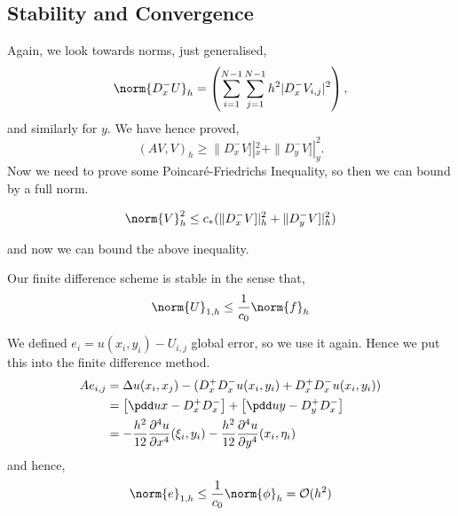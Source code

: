 \subsection{Stability and Convergence}
Again, we look towards norms, just generalised,
$$ \norm{D_x^- U}_h = \left( \sum_{i=1}^{N-1}\sum_{j=1}^{N-1} h^2|D_x^- V_{i,j}|^2 \right), $$
and similarly for $y$. We have hence proved,
$$ (AV, V)_h \ge \|D_x^- V]|_x^2 + \|D_y^- V]|_y^2. $$
Now we need to prove some Poincar\'e-Friedrichs Inequality, so then we can bound by a full norm.
\begin{nlemma}
  $$ \norm{V}_h^2 \le c_* (\|D_x^- V]|_h^2 + \|D_y^- V]|_h^2) $$
\end{nlemma}
and now we can bound the above inequality.
\begin{nthm}
  Our finite difference scheme is stable in the sense that,
  $$ \norm{U}_{1, h} \le \frac{1}{c_0}\norm{f}_h $$
\end{nthm}

\noindent
We defined $e_i = u(x_i, y_i) - U_{i, j}$ global error, so we use it again. Hence we put this into the finite difference method.
\begin{align*}
  Ae_{i,j} &= \Delta u(x_i, x_j) - (D_x^+D_x^- u(x_i, y_i) + D_x^+D_x^- u(x_i, y_i)) \\
  &= \left[ \pdd u x - D_x^+D_x^- \right] + \left[ \pdd u y - D_y^+ D_x^- \right] \\
  &= - \frac{h^2}{12}\frac{\partial^4 u}{\partial x^4}(\xi_i, y_i) - \frac{h^2}{12}\frac{\partial^4 u}{\partial y^4}(x_i, \eta_i)
\end{align*}
\noindent
and hence,
$$ \norm{e}_{1, h} \le \frac{1}{c_0}\norm{\phi}_h = \mathcal{O}(h^2) $$
